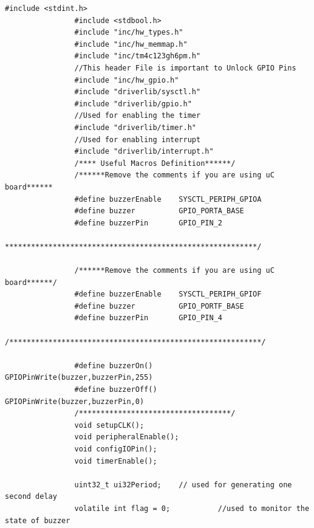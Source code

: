 \documentclass[a4paper,10pt,oneside]{article}
\begin{document}
			\begin{lstlisting}[style=CStyle]
				#include <stdint.h>
				#include <stdbool.h>
				#include "inc/hw_types.h"
				#include "inc/hw_memmap.h"
				#include "inc/tm4c123gh6pm.h"
				//This header File is important to Unlock GPIO Pins
				#include "inc/hw_gpio.h"
				#include "driverlib/sysctl.h"
				#include "driverlib/gpio.h"
				//Used for enabling the timer
				#include "driverlib/timer.h"
				//Used for enabling interrupt
				#include "driverlib/interrupt.h"
				/**** Useful Macros Definition******/
				/******Remove the comments if you are using uC board******
				#define buzzerEnable    SYSCTL_PERIPH_GPIOA
				#define buzzer          GPIO_PORTA_BASE
				#define buzzerPin       GPIO_PIN_2
				**********************************************************/
				
				/******Remove the comments if you are using uC board******/
				#define buzzerEnable    SYSCTL_PERIPH_GPIOF
				#define buzzer          GPIO_PORTF_BASE
				#define buzzerPin       GPIO_PIN_4
				/**********************************************************/
				
				#define buzzerOn()      GPIOPinWrite(buzzer,buzzerPin,255)
				#define buzzerOff()     GPIOPinWrite(buzzer,buzzerPin,0)
				/***********************************/
				void setupCLK();
				void peripheralEnable();
				void configIOPin();
				void timerEnable();
				
				uint32_t ui32Period;    // used for generating one second delay
				volatile int flag = 0;           //used to monitor the state of buzzer
				

\end{lstlisting}
\end{document}
